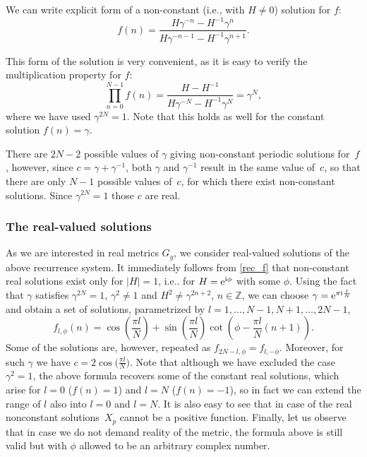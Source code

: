 \documentclass[pdftex]{sigma}
\numberwithin{equation}{section}
\begin{document}
We can write explicit form of a non-constant (i.e., with $H\neq 0$) solution for $f$:
\begin{equation}
f(n) = \frac{H \gamma^{-n} - H^{-1} \gamma^{n}}{H\gamma^{-n-1} - H^{-1}\gamma^{n+1}}.\label{rec_f}
\end{equation}

This form of the solution is very convenient, as it is easy to verify the multiplication property for $f$:
\begin{equation*}
\prod\limits_{n=0}^{N-1} f(n) = \frac{H-H^{-1}}{H\gamma^{-N}-H^{-1}\gamma^{N}}=\gamma^N,%
\end{equation*}
where we have used $\gamma^{2N}=1$. Note that this holds as well for the constant solution $f(n)=\gamma$.

There are $2N-2$ possible values of $\gamma$ giving non-constant periodic solutions for~$f$, however,
since $c=\gamma+\gamma^{-1}$, both $\gamma$ and $\gamma^{-1}$ result in the same value of~$c$, so that
there are only $N-1$ possible values of~$c$, for which there exist non-constant solutions.
Since $\gamma^{2N}=1$ those $c$ are real.

\subsubsection{The real-valued solutions}
As we are interested in real metrics $G_g$, we consider real-valued solutions of the above recurrence system. It immediately follows from \eqref{rec_f} that
non-constant real solutions exist only for \mbox{$|H|=1$}, i.e.. for $H={\rm e}^{{\rm i}\phi}$ with some $\phi$. Using the fact that $\gamma$ satisfies $\gamma^{2N}=1$, $\gamma^2\neq 1$
and $H^2\neq \gamma^{2n+2}$, $n\in\mathbb{Z}$, we can choose $\gamma = {\rm e}^{\pi {\rm i} \frac{l}{N}}$ and obtain a set of solutions, parametrized by $l=1,\dots ,N-1,\allowbreak N+1,\ldots, 2N-1$,
\begin{equation*}
f_{l,\phi}(n)=\cos\left(\frac{\pi l}{N}\right)+\sin\left(\frac{\pi l}{N}\right)\cot\left(\phi-\frac{\pi l}{N}(n+1)\right).
\end{equation*}
Some of the solutions are, however, repeated as $f_{2N-l,\phi}=f_{l,-\phi}$. Moreover, for such $\gamma$ we have
$c=2\cos\big(\frac{\pi l}{N}\big)$. Note that although we have excluded the case $\gamma^2=1$, the above formula recovers some of
the constant real solutions, which arise for
$l=0$ ($f(n)=1$) and $l=N$ ($f(n)=-1$), so in fact we can extend the range of $l$ also into $l=0$ and $l=N$. It is also easy to see that in case of the real nonconstant solutions~$X_p$ cannot be a positive
function. Finally, let us observe that in case we do not demand reality of the metric, the formula above is still valid but with $\phi$ allowed to be an arbitrary complex number.
\end{document}
